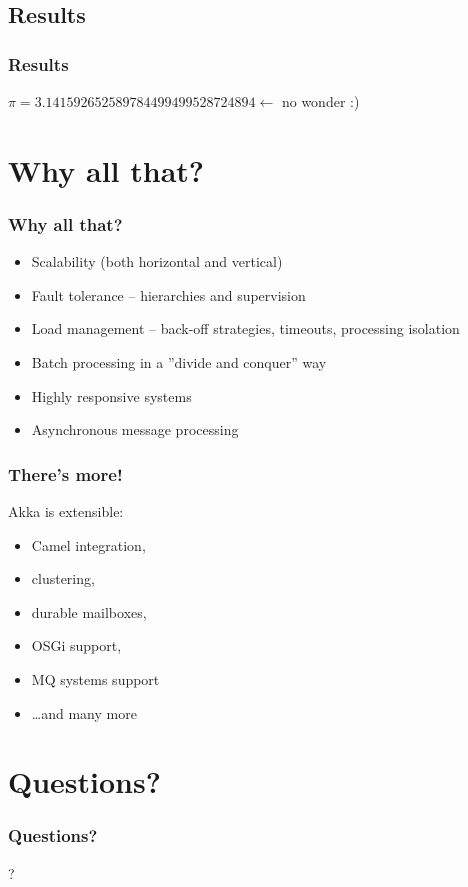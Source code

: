\documentclass[xcolor=dvipsnames]{beamer}
\begin{document}
\subsection{Results}

\begin{frame}
\frametitle{Results}
$\pi = 3.141592652589784499499528724894 \gets$ no wonder :)
\end{frame}


\section{Why all that?}

\begin{frame}
\frametitle{Why all that?}
\begin{itemize}
\item Scalability (both horizontal and vertical)
\item Fault tolerance -- hierarchies and supervision
\item Load management -- back-off strategies, timeouts, processing isolation
\item Batch processing in a ''divide and conquer'' way
\item Highly responsive systems
\item Asynchronous message processing
\end{itemize}
\end{frame}

\begin{frame}
\frametitle{There's more!}
Akka is extensible:
\begin{itemize}
\item Camel integration,
\item clustering,
\item durable mailboxes,
\item OSGi support,
\item MQ systems support
\item \ldots and many more
\end{itemize}
\end{frame}

\section{Questions?}

\begin{frame}
\frametitle{Questions?}
\begin{center}
\Huge{?}
\end{center}
\end{frame}
\end{document}
